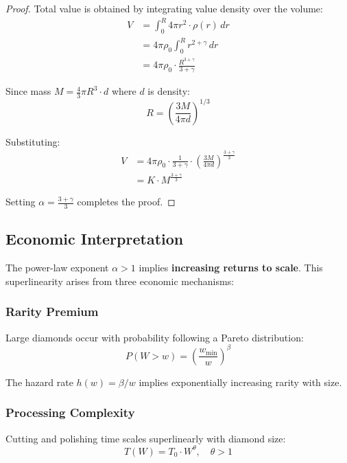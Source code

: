 \documentclass[12pt,a4paper]{article}
\begin{document}
\begin{proof}
Total value is obtained by integrating value density over the volume:
\begin{align}
V &= \int_0^R 4\pi r^2 \cdot \rho(r) \, dr \\
&= 4\pi\rho_0 \int_0^R r^{2+\gamma} \, dr \\
&= 4\pi\rho_0 \cdot \frac{R^{3+\gamma}}{3+\gamma}
\end{align}

Since mass $M = \frac{4}{3}\pi R^3 \cdot d$ where $d$ is density:
\begin{equation}
R = \left(\frac{3M}{4\pi d}\right)^{1/3}
\end{equation}

Substituting:
\begin{align}
V &= 4\pi\rho_0 \cdot \frac{1}{3+\gamma} \cdot \left(\frac{3M}{4\pi d}\right)^{\frac{3+\gamma}{3}} \\
&= K \cdot M^{\frac{3+\gamma}{3}}
\end{align}

Setting $\alpha = \frac{3+\gamma}{3}$ completes the proof.
\end{proof}

\subsection{Economic Interpretation}

The power-law exponent $\alpha > 1$ implies \textbf{increasing returns to scale}. This superlinearity arises from three economic mechanisms:

\subsubsection{Rarity Premium}

Large diamonds occur with probability following a Pareto distribution:
\begin{equation}
P(W > w) = \left(\frac{w_{\min}}{w}\right)^{\beta}
\end{equation}

The hazard rate $h(w) = \beta/w$ implies exponentially increasing rarity with size.

\subsubsection{Processing Complexity}

Cutting and polishing time scales superlinearly with diamond size:
\begin{equation}
T(W) = T_0 \cdot W^{\theta}, \quad \theta > 1
\end{equation}
\end{document}
